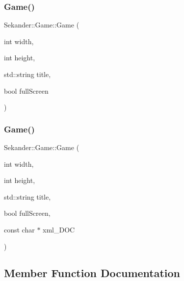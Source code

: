\mbox{\label{classSekander_1_1Game_afe9c8ee4d47148de8fed696efe7bd9ac}} 
\subsubsection{\texorpdfstring{Game()}{Game()}\hspace{0.1cm}{\footnotesize\ttfamily [2/3]}}
{\footnotesize\ttfamily Sekander\+::\+Game\+::\+Game (\begin{DoxyParamCaption}\item[{int}]{width,  }\item[{int}]{height,  }\item[{std\+::string}]{title,  }\item[{bool}]{full\+Screen }\end{DoxyParamCaption})}

\mbox{\label{classSekander_1_1Game_a187c141c1b8b70416dccfbfb15d2a3db}} 
\subsubsection{\texorpdfstring{Game()}{Game()}\hspace{0.1cm}{\footnotesize\ttfamily [3/3]}}
{\footnotesize\ttfamily Sekander\+::\+Game\+::\+Game (\begin{DoxyParamCaption}\item[{int}]{width,  }\item[{int}]{height,  }\item[{std\+::string}]{title,  }\item[{bool}]{full\+Screen,  }\item[{const char $\ast$}]{xml\+\_\+\+D\+OC }\end{DoxyParamCaption})}



\subsection{Member Function Documentation}
\mbox{\label{classSekander_1_1Game_a70fe3c4cc2af6708dc19ffd54a782283}} 
